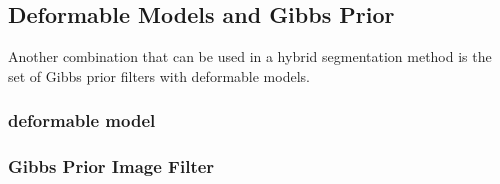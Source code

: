 \ifitkFullVersion

\fi



\subsection{Deformable Models and Gibbs Prior}

Another combination that can be used in a hybrid segmentation method is the
set of Gibbs prior filters with deformable models.

\subsubsection{deformable model}
\ifitkFullVersion

\fi


\subsubsection{Gibbs Prior Image Filter}
\ifitkFullVersion

\fi

